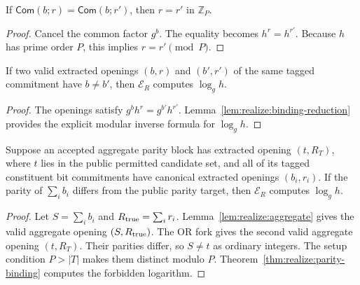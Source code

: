 \begin{lemma}\label{lem:global:unique-r}
If $\mathsf{Com}(b;r)=\mathsf{Com}(b;r')$,
then $r=r'$ in $\mathbb Z_P$.
\end{lemma}
\begin{proof}
Cancel the common factor $g^b$.
The equality becomes $h^r=h^{r'}$.
Because $h$ has prime order $P$,
this implies $r=r'\pmod P$.
\end{proof}

\begin{lemma}\label{lem:global:tag-conflict}
If two valid extracted openings
$(b,r)$ and $(b',r')$ of the same
tagged commitment have $b\neq b'$,
then $\mathcal E_R$ computes $\log_g h$.
\end{lemma}
\begin{proof}
The openings satisfy
$g^b h^r=g^{b'}h^{r'}$.
Lemma~\ref{lem:realize:binding-reduction}
provides the explicit modular inverse
formula for $\log_g h$.
\end{proof}

\begin{lemma}\label{lem:global:row-conflict}
Suppose an accepted aggregate parity
block has extracted opening $(t,R_T)$,
where $t$ lies in the public permitted
candidate set, and all of its tagged
constituent bit commitments have
canonical extracted openings
$(b_i,r_i)$.
If the parity of $\sum_i b_i$
differs from the public parity target,
then $\mathcal E_R$ computes $\log_g h$.
\end{lemma}
\begin{proof}
Let $S=\sum_i b_i$ and
$R_{\rm true}=\sum_i r_i$.
Lemma~\ref{lem:realize:aggregate}
gives the valid aggregate opening
$(S,R_{\rm true})$. The OR fork gives
the second valid aggregate opening
$(t,R_T)$. Their parities differ,
so $S\neq t$ as ordinary integers.
The setup condition $P>|T|$
makes them distinct modulo $P$.
Theorem~\ref{thm:realize:parity-binding}
computes the forbidden logarithm.
\end{proof}

